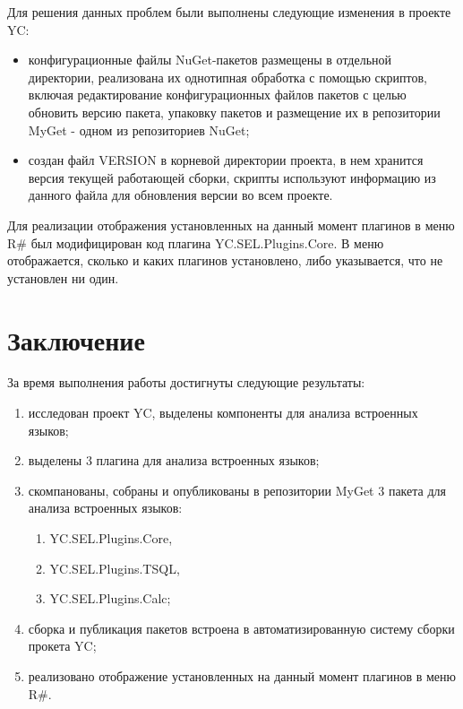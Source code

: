 \documentclass{matmex-diploma}
\begin{document}
Для решения данных проблем были выполнены следующие изменения в проекте YC:

\begin{itemize}
\item
конфигурационные файлы NuGet-пакетов размещены в отдельной директории, реализована их однотипная обработка с помощью скриптов, включая редактирование конфигурационных файлов пакетов с целью обновить версию пакета, упаковку пакетов и размещение их в репозитории MyGet - одном из репозиториев NuGet;
\item
создан файл VERSION в корневой директории проекта, в нем хранится версия текущей работающей сборки, скрипты используют информацию из данного файла для обновления версии во всем проекте.
\end{itemize}

Для реализации отображения установленных на данный момент плагинов в меню R\# был модифицирован код плагина YC.SEL.Plugins.Core. В меню отображается, сколько и каких плагинов установлено, либо указывается, что не установлен ни один.


\section*{Заключение}

За время выполнения работы достигнуты следующие результаты:

\begin{enumerate}
\item
исследован проект YC, выделены компоненты для анализа встроенных языков;
\item
выделены 3 плагина для анализа встроенных языков;
\item
скомпанованы, собраны и опубликованы в репозитории MyGet 3 пакета для анализа встроенных языков:
\begin{enumerate}
\item
YC.SEL.Plugins.Core,
\item
YC.SEL.Plugins.TSQL,
\item
YC.SEL.Plugins.Calc;
\end{enumerate}
\item
сборка и публикация пакетов встроена в автоматизированную систему сборки прокета YC;
\item
реализовано отображение установленных на данный момент плагинов в меню R\#.
\end{enumerate}



\end{document}
